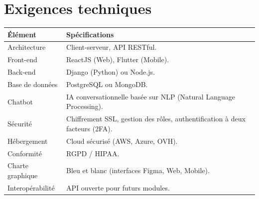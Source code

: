 ﻿\documentclass[12pt,a4paper]{report}
\begin{document}
\newpage  
\section*{Exigences techniques}  

\begin{longtable}{|p{5cm}|p{10cm}|}  
\hline  
\textbf{Élément} & \textbf{Spécifications} \\  
\hline  
Architecture & Client-serveur, API RESTful. \\  
\hline  
Front-end & ReactJS (Web), Flutter (Mobile). \\  
\hline  
Back-end & Django (Python) ou Node.js. \\  
\hline  
Base de données & PostgreSQL ou MongoDB. \\  
\hline  
Chatbot & IA conversationnelle basée sur NLP (Natural Language Processing). \\  
\hline  
Sécurité & Chiffrement SSL, gestion des rôles, authentification à deux facteurs (2FA). \\  
\hline  
Hébergement & Cloud sécurisé (AWS, Azure, OVH). \\  
\hline  
Conformité & RGPD / HIPAA. \\  
\hline  
Charte graphique & Bleu et blanc (interfaces Figma, Web, Mobile). \\  
\hline  
Interopérabilité & API ouverte pour futurs modules. \\  
\hline  
\end{longtable}  
\end{document}
